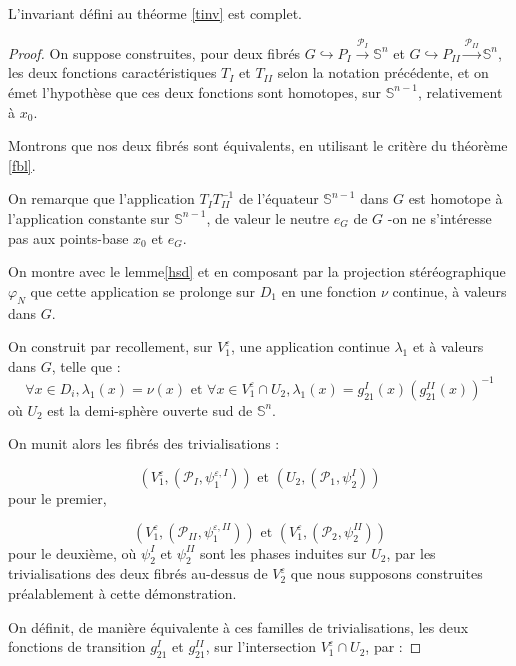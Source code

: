 \begin{theo}\label{tinvc}
L'invariant d\'efini au th\'eorme \ref{tinv} est complet.
\end{theo}

\begin{proof}
On suppose construites, pour deux fibrés $G \hookrightarrow P_I \xrightarrow{\mathcal{P}_I} \mathbb{S}^n$ %
et $G \hookrightarrow P_{II} \xrightarrow{\mathcal{P}_{II}} \mathbb{S}^n$, %
les deux fonctions caractéristiques $T_I$ et $T_{II}$ selon la notation précédente, %
et on émet l'hypothèse que ces deux fonctions sont homotopes, sur $\mathbb{S}^{n-1}$, relativement à $x_0$.

\par
Montrons que nos deux fibrés sont équivalents, en utilisant le critère du théorème \ref{fbl}.

\par
On remarque que l'application $T_I T_{II}^{-1}$ de l'équateur $\mathbb{S}^{n-1}$ dans $G$ est homotope à l'application constante sur $\mathbb{S}^{n-1}$, %
de valeur le neutre $e_G$ de $G$ -on ne s'intéresse pas aux points-base $x_0$ et $e_G$.

\par
On montre avec le lemme\ref{hsd} et en composant par la projection stéréographique $\varphi_N$ %
que cette application se prolonge sur $D_1$ en une fonction $\nu$ continue, à valeurs dans $G$.

\par
On construit par recollement, sur $V_1^{\varepsilon}$, une application continue $\lambda_1$ et à valeurs dans $G$, telle que :
\[\forall x \in D_i , \lambda_1(x) = \nu(x)\text{ et }\forall x \in V_1^{\varepsilon} \cap U_2 , \lambda_1 (x) = g^{I}_{21}(x) (g^{II}_{21}(x))^{-1}\]
où $U_2$ est la demi-sphère ouverte sud de $\mathbb{S}^n$.

On munit alors les fibrés des trivialisations :

\[(V_1^{\varepsilon},(\mathcal{P}_I,\psi_1^{\varepsilon , I}))\text{ et }(U_2,(\mathcal{P}_1,\psi_2^I))\]
pour le premier,

\[(V_1^{\varepsilon},(\mathcal{P}_{II},\psi_1^{\varepsilon , II}))\text{ et }(V_1^{\varepsilon},(\mathcal{P}_2,\psi_2^{II}))\]
pour le deuxième, où $\psi_2^I$ et $\psi_2^{II}$ sont les phases induites sur $U_2$, %
par les trivialisations des deux fibrés au-dessus de $V_2^{\varepsilon}$ que nous supposons construites préalablement à cette démonstration.

\par
On définit, de manière équivalente à ces familles de trivialisations, %
les deux fonctions de transition $g_{21}^I$ et $g_{21}^{II}$, sur l'intersection $V_1^{\varepsilon} \cap U_2$, par :


\end{proof}
